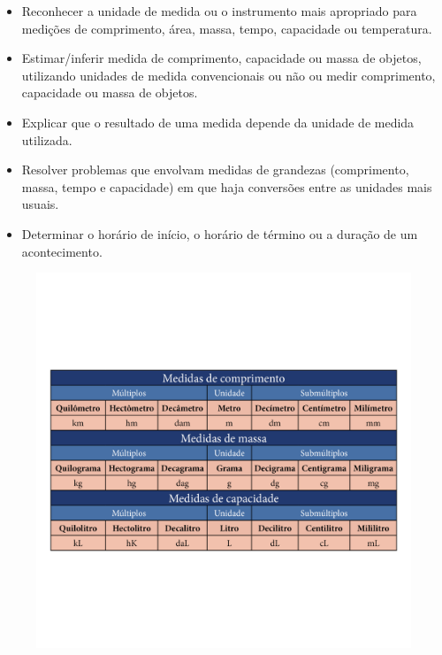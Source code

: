 {


\begin{itemize}
\item Reconhecer a unidade de medida ou o instrumento mais apropriado para
medições de comprimento, área, massa, tempo, capacidade ou temperatura.

\item Estimar/inferir medida de comprimento, capacidade ou massa de objetos,
utilizando unidades de medida convencionais ou não ou medir comprimento,
capacidade ou massa de objetos.

\item Explicar que o resultado de uma medida depende da unidade de medida utilizada.

\item Resolver problemas que envolvam medidas de grandezas (comprimento,
massa, tempo e capacidade) em que haja conversões entre as unidades mais
usuais.

\item Determinar o horário de início, o horário de término ou a duração de
um acontecimento.
\end{itemize}


\begin{figure}[htpb!]
\includegraphics[width=\textwidth]{../ilustracoes/MAT5/SAEB_5ANO_MAT_figura30_1.png}
\end{figure}

}
